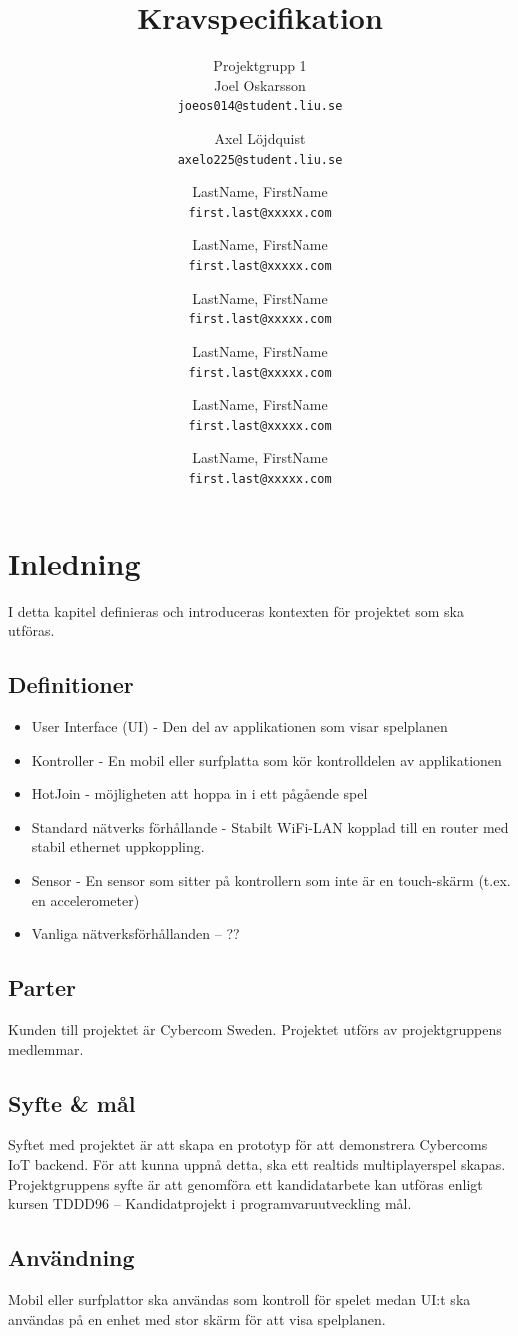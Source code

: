 \documentclass[10pt]{article}
\title{Kravspecifikation}
\author{
	Projektgrupp 1\\
	Joel Oskarsson\\
	\texttt{joeos014@student.liu.se}
	\and
	Axel Löjdquist\\
	\texttt{axelo225@student.liu.se}
	\and
	LastName, FirstName\\
	\texttt{first.last@xxxxx.com}
	\and
	LastName, FirstName\\
	\texttt{first.last@xxxxx.com}
	\and
	LastName, FirstName\\
	\texttt{first.last@xxxxx.com}
  	\and
  	LastName, FirstName\\
  	\texttt{first.last@xxxxx.com}
  	\and
  	LastName, FirstName\\
  	\texttt{first.last@xxxxx.com}
  	\and
  	LastName, FirstName\\
  	\texttt{first.last@xxxxx.com}
}
\begin{document}
\maketitle
\pagebreak
\tableofcontents
\pagebreak
\section{Inledning}
	I detta kapitel definieras och introduceras kontexten för projektet som ska utföras.

	\subsection{Definitioner}
		\begin{itemize}
		\item User Interface (UI) - Den del av applikationen som visar spelplanen
		\item Kontroller - En mobil eller surfplatta som kör kontrolldelen av applikationen
		\item HotJoin - möjligheten att hoppa in i ett pågående spel
		\item Standard nätverks förhållande - Stabilt WiFi-LAN kopplad till en router med stabil ethernet uppkoppling.
		\item Sensor - En sensor som sitter på kontrollern som inte är en touch-skärm (t.ex. en accelerometer)
		\item Vanliga nätverksförhållanden -- ??
		\end{itemize}	

	\subsection{Parter}
	Kunden till projektet är Cybercom Sweden. Projektet utförs av projektgruppens medlemmar.
	\subsection{Syfte \& mål}
		Syftet med projektet är att skapa en prototyp för att demonstrera Cybercoms IoT backend. För att kunna uppnå detta, ska ett realtids multiplayerspel skapas. Projektgruppens syfte är att genomföra ett kandidatarbete kan utföras enligt kursen TDDD96 -- Kandidatprojekt i programvaruutveckling mål.
	
	\subsection{Användning}
		Mobil eller surfplattor ska användas som kontroll för spelet medan UI:t ska användas på en enhet med stor skärm för att visa spelplanen.
	
\end{document}
